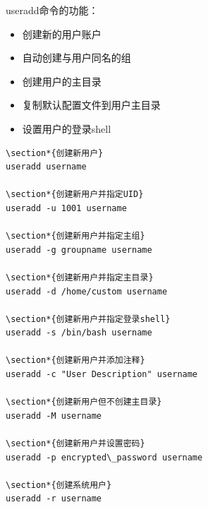 \documentclass[12pt,UTF8]{ctexbook}
\begin{document}
useradd命令的功能：
\begin{itemize}
    \item 创建新的用户账户
    \item 自动创建与用户同名的组
    \item 创建用户的主目录
    \item 复制默认配置文件到用户主目录
    \item 设置用户的登录shell
\end{itemize}

\begin{verbatim}
\section*{创建新用户}
useradd username

\section*{创建新用户并指定UID}
useradd -u 1001 username

\section*{创建新用户并指定主组}
useradd -g groupname username

\section*{创建新用户并指定主目录}
useradd -d /home/custom username

\section*{创建新用户并指定登录shell}
useradd -s /bin/bash username

\section*{创建新用户并添加注释}
useradd -c "User Description" username

\section*{创建新用户但不创建主目录}
useradd -M username

\section*{创建新用户并设置密码}
useradd -p encrypted\_password username

\section*{创建系统用户}
useradd -r username
\end{verbatim}
\end{document}
